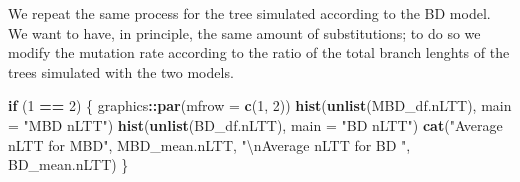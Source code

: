 \documentclass[]{article}
\newenvironment{Shaded}{\begin{snugshade}}{\end{snugshade}}
\newcommand{\KeywordTok}[1]{\textcolor[rgb]{0.13,0.29,0.53}{\textbf{#1}}}
\newcommand{\DataTypeTok}[1]{\textcolor[rgb]{0.13,0.29,0.53}{#1}}
\newcommand{\DecValTok}[1]{\textcolor[rgb]{0.00,0.00,0.81}{#1}}
\newcommand{\CharTok}[1]{\textcolor[rgb]{0.31,0.60,0.02}{#1}}
\newcommand{\StringTok}[1]{\textcolor[rgb]{0.31,0.60,0.02}{#1}}
\newcommand{\ControlFlowTok}[1]{\textcolor[rgb]{0.13,0.29,0.53}{\textbf{#1}}}
\newcommand{\OperatorTok}[1]{\textcolor[rgb]{0.81,0.36,0.00}{\textbf{#1}}}
\newcommand{\NormalTok}[1]{#1}
\begin{document}
We repeat the same process for the tree simulated according to the BD
model. We want to have, in principle, the same amount of substitutions;
to do so we modify the mutation rate according to the ratio of the total
branch lenghts of the trees simulated with the two models.

\begin{Shaded}
\begin{Highlighting}[]
\ControlFlowTok{if}\NormalTok{ (}\DecValTok{1} \OperatorTok{==}\StringTok{ }\DecValTok{2}\NormalTok{) \{}
\NormalTok{  graphics}\OperatorTok{::}\KeywordTok{par}\NormalTok{(}\DataTypeTok{mfrow =} \KeywordTok{c}\NormalTok{(}\DecValTok{1}\NormalTok{, }\DecValTok{2}\NormalTok{))}
  \KeywordTok{hist}\NormalTok{(}\KeywordTok{unlist}\NormalTok{(MBD_df.nLTT), }\DataTypeTok{main =} \StringTok{"MBD nLTT"}\NormalTok{)}
  \KeywordTok{hist}\NormalTok{(}\KeywordTok{unlist}\NormalTok{(BD_df.nLTT), }\DataTypeTok{main =} \StringTok{"BD nLTT"}\NormalTok{)}
  \KeywordTok{cat}\NormalTok{(}\StringTok{"Average nLTT for MBD"}\NormalTok{, MBD_mean.nLTT, }\StringTok{"}\CharTok{\textbackslash{}n}\StringTok{Average nLTT for BD "}\NormalTok{, BD_mean.nLTT)}
\NormalTok{\}}
\end{Highlighting}
\end{Shaded}
\end{document}
